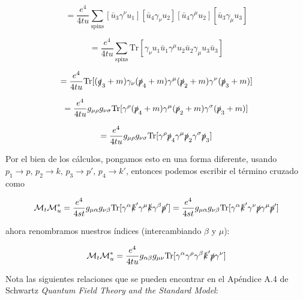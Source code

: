 \begin{equation}
= \frac{e^4}{4tu} \sum_{\text{spins}} [\bar{u}_3 \gamma^\nu u_1] [\bar{u}_4 \gamma_\nu u_2] [\bar{u}_4 \gamma^\mu u_2] [\bar{u}_3 \gamma_\mu u_3]
\end{equation}

\begin{equation}
= \frac{e^4}{4tu} \sum_{\text{spins}} \text{Tr}[\gamma_\nu u_1 \bar{u}_1 \gamma^\mu u_2 \bar{u}_2 \gamma_\mu u_3 \bar{u}_3]
\end{equation}

\begin{equation}
= \frac{e^4}{4tu} \text{Tr}[(\slashed{q}_3 + m) \gamma_\nu (\slashed{p}_4 + m)\gamma^\mu (\slashed{p}_2 + m)\gamma^\nu (\slashed{p}_3 + m)]
\end{equation}

\begin{equation}
= \frac{e^4}{4tu} g_{\mu \rho} g_{\nu \sigma} \text{Tr}[\gamma^\rho (\slashed{p}_4 + m) \gamma^\mu (\slashed{p}_2 + m) \gamma^\sigma (\slashed{p}_3 + m)]
\end{equation}

\begin{equation}
= \frac{e^4}{4tu} g_{\mu \rho} g_{\nu \sigma} \text{Tr}[\gamma^\rho \slashed{p}_4 \gamma^\mu \slashed{p}_2 \gamma^\sigma \slashed{p}_3 ]
\end{equation}

Por el bien de los cálculos, pongamos esto en una forma diferente, usando $ p_1 \to p, \, p_2 \to k,\, p_3 \to p', \, p_4 \to k' $, entonces podemos escribir el término cruzado como

\begin{equation}
\mathcal{M}_t \mathcal{M}_u^* = \frac{e^4}{4st} g_{\mu \alpha} g_{\nu \beta} \text{Tr}[\gamma^\alpha \slashed{k}' \gamma^\mu \slashed{k} \gamma^\beta \slashed{p}'] = \frac{e^4}{4st} g_{\mu \alpha} g_{\nu \beta} \text{Tr}[\gamma^\alpha \slashed{k}' \gamma^\nu \slashed{p} \gamma^\mu \slashed{p}']
\end{equation}

ahora renombramos nuestros índices (intercambiando $\beta$ y $\mu$):

\begin{equation}
\mathcal{M}_t \mathcal{M}_u^* = \frac{e^4}{4tu} g_{\alpha \beta} g_{\mu \nu} \text{Tr}[\gamma^\alpha \gamma^\rho \gamma^\beta \slashed{k}' \slashed{p} \gamma^\nu]
\end{equation}

Nota las siguientes relaciones que se pueden encontrar en el Apéndice A.4 de Schwartz \textit{Quantum Field Theory and the Standard Model}:

